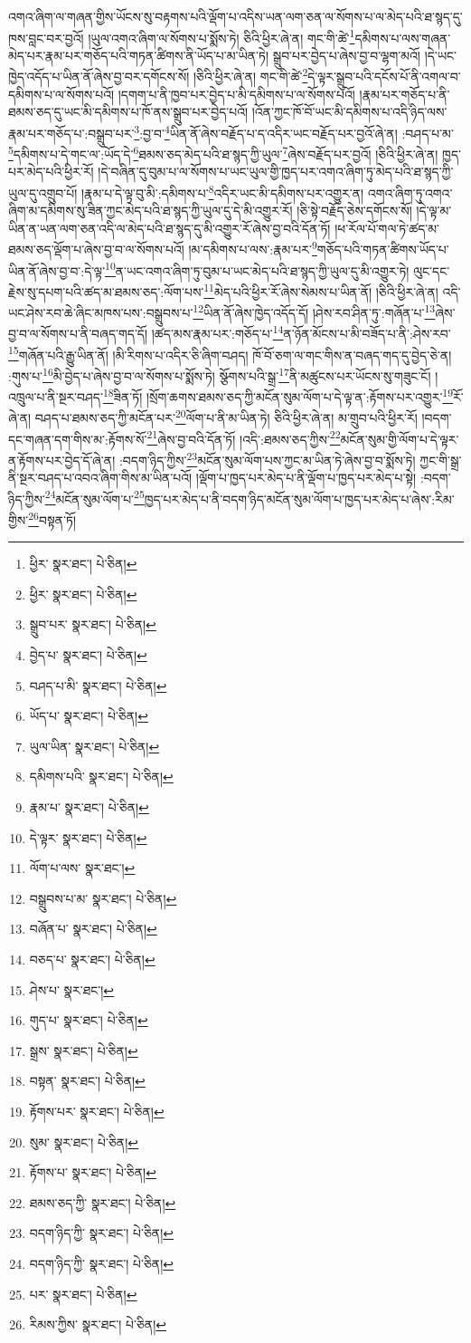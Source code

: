 འགའ་ཞིག་ལ་གཞན་གྱིས་ཡོངས་སུ་བརྟགས་པའི་ལྡོག་པ་འདིས་ཡན་ལག་ཅན་ལ་སོགས་པ་ལ་མེད་པའི་ཐ་སྙད་དུ་ཁས་བླང་བར་བྱའོ། །ཡུལ་འགའ་ཞིག་ལ་སོགས་པ་སྨོས་ཏེ། ཅིའི་ཕྱིར་ཞེ་ན། གང་གི་ཚེ་\footnote{ཕྱིར་  སྣར་ཐང་།  པེ་ཅིན། }དམིགས་པ་ལས་གཞན་མེད་པར་རྣམ་པར་གཅོད་པའི་གཏན་ཚིགས་ནི་ཡོད་པ་མ་ཡིན་ཏེ། སྒྲུབ་པར་བྱེད་པ་ཞེས་བྱ་བ་ལྷག་མའོ། །དེ་ཡང་ཁྱེད་འདོད་པ་ཡིན་ནོ་ཞེས་བྱ་བར་དགོངས་སོ། །ཅིའི་ཕྱིར་ཞེ་ན། གང་གི་ཚེ་\footnote{ཕྱིར་  སྣར་ཐང་།  པེ་ཅིན། }དེ་ལྟར་སྒྲུབ་པའི་དངོས་པོ་ནི་འགལ་བ་དམིགས་པ་ལ་སོགས་པའོ། །དགག་པ་ནི་ཁྱབ་པར་བྱེད་པ་མི་དམིགས་པ་ལ་སོགས་པའོ། །རྣམ་པར་གཅོད་པ་ནི་ཐམས་ཅད་དུ་ཡང་མི་དམིགས་པ་ཁོ་ནས་སྒྲུབ་པར་བྱེད་པའོ། །འོན་ཀྱང་ཁོ་བོ་ཡང་མི་དམིགས་པ་འདི་ཉིད་ལས་རྣམ་པར་གཅོད་པ་:བསྒྲུབ་པར་\footnote{སྒྲུབ་པར་  སྣར་ཐང་།  པེ་ཅིན། }:བྱ་བ་\footnote{བྱེད་པ་  སྣར་ཐང་།  པེ་ཅིན། }ཡིན་ནོ་ཞེས་བརྗོད་པ་ད་འདིར་ཡང་བརྗོད་པར་བྱའོ་ཞེ་ན། :བཤད་པ་མ་\footnote{བཤད་པ་མི་  སྣར་ཐང་།  པེ་ཅིན། }དམིགས་པ་དེ་གང་ལ་:ཡོད་དེ་\footnote{ཡོད་པ་  སྣར་ཐང་།  པེ་ཅིན། }ཐམས་ཅད་མེད་པའི་ཐ་སྙད་ཀྱི་ཡུལ་\footnote{ཡུལ་ཡིན་  སྣར་ཐང་།  པེ་ཅིན། }ཞེས་བརྗོད་པར་བྱའོ། །ཅིའི་ཕྱིར་ཞེ་ན། ཁྱད་པར་མེད་པའི་ཕྱིར་རོ། །དེ་བཞིན་དུ་བུམ་པ་ལ་སོགས་པ་ཡང་ཡུལ་གྱི་ཁྱད་པར་འགའ་ཞིག་ཏུ་མེད་པའི་ཐ་སྙད་ཀྱི་ཡུལ་དུ་འགྲུབ་པོ། །རྣམ་པ་དེ་ལྟ་བུ་མི་:དམིགས་པ་\footnote{དམིགས་པའི་  སྣར་ཐང་།  པེ་ཅིན། }འདིར་ཡང་མི་དམིགས་པར་འགྱུར་ན། འགའ་ཞིག་ཏུ་འགའ་ཞིག་མ་དམིགས་སུ་ཟིན་ཀྱང་མེད་པའི་ཐ་སྙད་ཀྱི་ཡུལ་དུ་དེ་མི་འགྱུར་རོ། །ཅི་སྟེ་བརྗོད་ཅེས་དགོངས་སོ། །དེ་ལྟ་མ་ཡིན་ན་ཡན་ལག་ཅན་འདི་ལ་མེད་པའི་ཐ་སྙད་དུ་མི་འགྱུར་རོ་ཞེས་བྱ་བའི་དོན་ཏོ། །ཕ་རོལ་པོ་གལ་ཏེ་ཚད་མ་ཐམས་ཅད་ལྡོག་པ་ཞེས་བྱ་བ་ལ་སོགས་པའོ། །མ་དམིགས་པ་ལས་:རྣམ་པར་\footnote{རྣམ་པ་  སྣར་ཐང་།  པེ་ཅིན། }གཅོད་པའི་གཏན་ཚིགས་ཡོད་པ་ཡིན་ནོ་ཞེས་བྱ་བ་:དེ་ལྟ་\footnote{དེ་ལྟར་  སྣར་ཐང་།  པེ་ཅིན། }ན་ཡང་འགའ་ཞིག་ཏུ་བུམ་པ་ཡང་མེད་པའི་ཐ་སྙད་ཀྱི་ཡུལ་དུ་མི་འགྱུར་ཏེ། ལུང་དང་རྗེས་སུ་དཔག་པའི་ཚད་མ་ཐམས་ཅད་:ལོག་པས་\footnote{ལོག་པ་ལས་  སྣར་ཐང་། }མེད་པའི་ཕྱིར་རོ་ཞེས་སེམས་པ་ཡིན་ནོ། །ཅིའི་ཕྱིར་ཞེ་ན། འདི་ཡང་ཤེས་རབ་ཆེ་ཞིང་མཁས་པས་:བསྒྲུབས་པ་\footnote{བསྒྲུབས་པ་མ་  སྣར་ཐང་།  པེ་ཅིན། }ཡིན་ནོ་ཞེས་ཁྱེད་འདོད་དོ། །ཤེས་རབ་ཤིན་ཏུ་:གཞོན་པ་\footnote{བཞོན་པ་  སྣར་ཐང་།  པེ་ཅིན། }ཞེས་བྱ་བ་ལ་སོགས་པ་ནི་བཞད་གད་དོ། །ཚད་མས་རྣམ་པར་:གཅོད་པ་\footnote{བཅད་པ་  སྣར་ཐང་།  པེ་ཅིན། }ན་ཉོན་མོངས་པ་མི་བཟོད་པ་ནི་:ཤེས་རབ་\footnote{ཤེས་པ་  སྣར་ཐང་། }གཞོན་པའི་རྒྱུ་ཡིན་ནོ། །མི་རིགས་པ་འདིར་ཅི་ཞིག་བཤད། ཁོ་བོ་ཅག་ལ་གང་གིས་ན་བཞད་གད་དུ་བྱེད་ཅེ་ན། :གུས་པ་\footnote{གུད་པ་  སྣར་ཐང་།  པེ་ཅིན། }མི་བྱེད་པ་ཞེས་བྱ་བ་ལ་སོགས་པ་སྨོས་ཏེ། སྩོགས་པའི་སྒྲ་\footnote{སྒྲས་  སྣར་ཐང་།  པེ་ཅིན། }ནི་མཚུངས་པར་ཡོངས་སུ་གཟུང་ངོ། །འཁྲུལ་པ་ནི་སྔར་བཤད་\footnote{བསྟན་  སྣར་ཐང་།  པེ་ཅིན། }ཟིན་ཏོ། །སྲོག་ཆགས་ཐམས་ཅད་ཀྱི་མངོན་སུམ་ལོག་པ་དེ་ལྟ་ན་:རྟོགས་པར་འགྱུར་\footnote{རྟོགས་པར་  སྣར་ཐང་།  པེ་ཅིན། }རོ་ཞེ་ན། བཤད་པ་ཐམས་ཅད་ཀྱི་མངོན་པར་\footnote{སུམ་  སྣར་ཐང་།  པེ་ཅིན། }ལོག་པ་ནི་མ་ཡིན་ཏེ། ཅིའི་ཕྱིར་ཞེ་ན། མ་གྲུབ་པའི་ཕྱིར་རོ། །བདག་དང་གཞན་དག་གིས་མ་:རྟོགས་སོ་\footnote{རྟོགས་པ་  སྣར་ཐང་།  པེ་ཅིན། }ཞེས་བྱ་བའི་དོན་ཏོ། །འདི་:ཐམས་ཅད་ཀྱིས་\footnote{ཐམས་ཅད་ཀྱི་  སྣར་ཐང་།  པེ་ཅིན། }མངོན་སུམ་གྱི་ལོག་པ་དེ་ལྟར་ན་རྟོགས་པར་བྱེད་དོ་ཞེ་ན། :བདག་ཉིད་ཀྱིས་\footnote{བདག་ཉིད་ཀྱི་  སྣར་ཐང་།  པེ་ཅིན། }མངོན་སུམ་ལོག་པས་ཀྱང་མ་ཡིན་ཏེ་ཞེས་བྱ་བ་སྨོས་ཏེ། ཀྱང་གི་སྒྲ་ནི་སྔར་བཤད་པ་འབའ་ཞིག་གིས་མ་ཡིན་པའོ། །ལྡོག་པ་ཁྱད་པར་མེད་པ་ནི་ལྡོག་པ་ཁྱད་པར་མེད་པ་སྟེ། :བདག་ཉིད་ཀྱིས་\footnote{བདག་ཉིད་ཀྱི་  སྣར་ཐང་།  པེ་ཅིན། }མངོན་སུམ་ལོག་པ་\footnote{པར་  སྣར་ཐང་།  པེ་ཅིན། }ཁྱད་པར་མེད་པ་ནི་བདག་ཉིད་མངོན་སུམ་ལོག་པ་ཁྱད་པར་མེད་པ་ཞེས་:རིམ་གྱིས་\footnote{རིམས་ཀྱིས་  སྣར་ཐང་།  པེ་ཅིན། }བསྟན་ཏོ། 